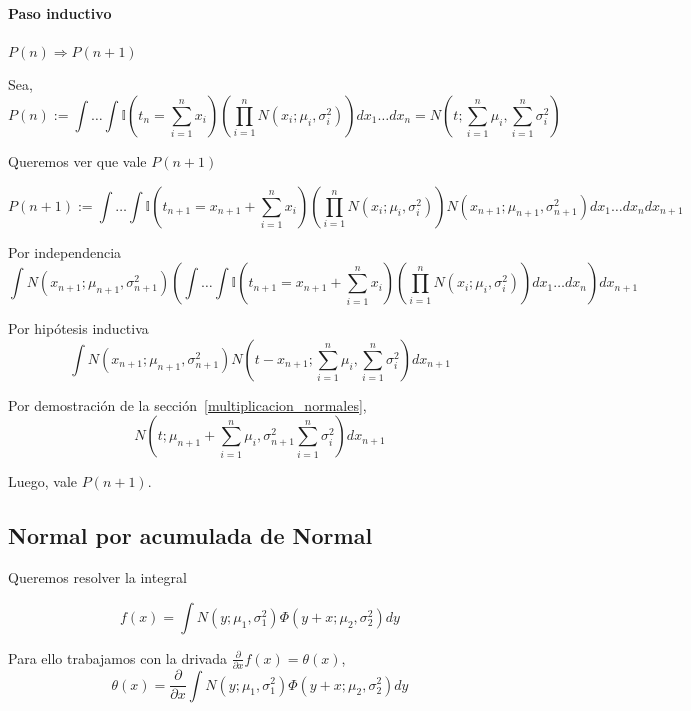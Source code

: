 \documentclass[article]{jss}
\begin{document}
\begin{appendix}
 
\paragraph{Paso inductivo} $P(n) \Rightarrow P(n+1)$

Sea,
\begin{equation}
 P(n) :=\int \dots \int \mathbb{I}(t_n= \sum_{i=1}^n x_i ) \left( \prod_{i=1}^n N(x_i;\mu_i,\sigma_i^2) \right) dx_1 \dots dx_n = N(t;\sum_{i=1}^n \mu_i,\sum_{i=1}^n \sigma_i^2 ) 
\end{equation}

Queremos ver que vale $P(n+1)$

\begin{equation}
 P(n+1) := \int \dots \int \mathbb{I}(t_{n+1}=  x_{n+1} + \sum_{i=1}^{n} x_i ) \left( \prod_{i=1}^{n} N(x_i;\mu_i,\sigma_i^2) \right) N(x_{n+1};\mu_{n+1},\sigma_{n+1}^2) dx_1 \dots dx_{n} dx_{n+1}  
\end{equation}

Por independencia
\begin{equation}
 \int N(x_{n+1};\mu_{n+1},\sigma_{n+1}^2) \left( \int \dots \int \mathbb{I}(t_{n+1}= x_{n+1} + \sum_{i=1}^{n} x_i ) \left( \prod_{i=1}^{n} N(x_i;\mu_i,\sigma_i^2) \right)  dx_1 \dots dx_{n}\right) dx_{n+1}  
\end{equation}

Por hip\'otesis inductiva
\begin{equation}
 \int N(x_{n+1};\mu_{n+1},\sigma_{n+1}^2) N(t-x_{n+1};\sum_{i=1}^n \mu_i,\sum_{i=1}^n \sigma_i^2) dx_{n+1}  
\end{equation}

Por demostraci\'on de la secci\'on~\ref{multiplicacion_normales},
\begin{equation}
  N(t;\mu_{n+1}+\sum_{i=1}^{n} \mu_i,\sigma_{n+1}^2 \sum_{i=1}^n \sigma_i^2) dx_{n+1}  
\end{equation}

Luego, vale $P(n+1)$.

\subsection{Normal por acumulada de Normal}

Queremos resolver la integral

\begin{equation}
 f(x) = \int N(y;\mu_1,\sigma_1^2)\Phi(y+x;\mu_2,\sigma_2^2) dy
\end{equation}

Para ello trabajamos con la drivada $\frac{\partial}{\partial x}f(x) = \theta(x)$,
\begin{equation}
 \theta(x) = \frac{\partial}{\partial x}\int N(y;\mu_1,\sigma_1^2)\Phi(y+x;\mu_2,\sigma_2^2) dy
\end{equation}


\end{appendix}
\end{document}
